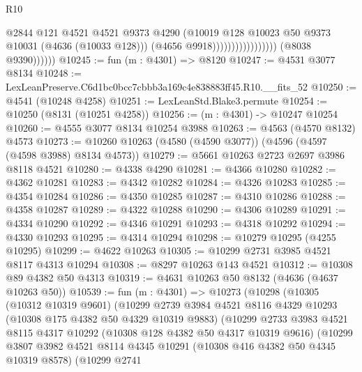\begin{lexlean}{R10}
\begin{coremodule}
                                              @2844
                                              @121
                                              @4521
                                              @4521
                                              @9373
                                              @4290
                                              (@10019
                                                @128
                                                @10023
                                                @50
                                                @9373
                                                @10031
                                                (@4636 (@10033 @128)))
                                              (@4656 @9918)))))))))))))))))
              (@8038 @9390))))))
@10245 := fun (m : @4301) => @8120
@10247 := @4531 @3077 @8134
@10248 := LexLeanPreserve.C6d1bc0bcc7cbbb3a169c4e838883ff45.R10.__fits_52
@10250 := @4541 (@10248 @4258)
@10251 := LexLeanStd.Blake3.permute
@10254 := @10250 (@8131 (@10251 @4258))
@10256 := (m : @4301) -> @10247 @10254
@10260 := @4555 @3077 @8134 @10254 @3988
@10263 := @4563 (@4570 @8132) @4573
@10273 := @10260 @10263 (@4580 (@4590 @3077)) (@4596 (@4597 (@4598 @3988) @8134 @4573))
@10279 := @5661 @10263 @2723 @2697 @3986 @8118 @4521
@10280 := @4338 @4290
@10281 := @4366 @10280
@10282 := @4362 @10281
@10283 := @4342 @10282
@10284 := @4326 @10283
@10285 := @4354 @10284
@10286 := @4350 @10285
@10287 := @4310 @10286
@10288 := @4358 @10287
@10289 := @4322 @10288
@10290 := @4306 @10289
@10291 := @4334 @10290
@10292 := @4346 @10291
@10293 := @4318 @10292
@10294 := @4330 @10293
@10295 := @4314 @10294
@10298 := @10279 @10295 (@4255 @10295)
@10299 := @4622 @10263
@10305 := @10299 @2731 @3985 @4521 @8117 @4313 @10294
@10308 := @8297 @10263 @143 @4521
@10312 := @10308 @89 @4382 @50 @4313
@10319 := @4631 @10263 @50 @8132 (@4636 (@4637 @10263 @50))
@10539 := fun (m : @4301) =>
  @10273
    (@10298
      (@10305
        (@10312 @10319 @9601)
        (@10299
          @2739
          @3984
          @4521
          @8116
          @4329
          @10293
          (@10308 @175 @4382 @50 @4329 @10319 @9883)
          (@10299
            @2733
            @3983
            @4521
            @8115
            @4317
            @10292
            (@10308 @128 @4382 @50 @4317 @10319 @9616)
            (@10299
              @3807
              @3982
              @4521
              @8114
              @4345
              @10291
              (@10308 @416 @4382 @50 @4345 @10319 @8578)
              (@10299
                @2741

\end{coremodule}
\end{lexlean}
